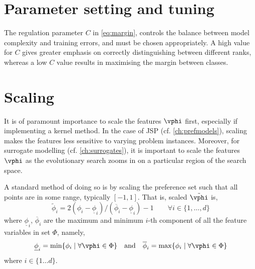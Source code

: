 \begin{comment}
\subsection{Kernel functions}
There are several choices for a kernel $\kappa$, e.g., \emph{polynomial kernel},
\begin{eqnarray}
\kappa_{\text{poly}}(\vec{x}_i,\vec{x}_j)&=& \left(1+\inner{\vec{x}_i}{\vec{x}_j} \right)^p
\end{eqnarray}
of order $p$, or the most commonly used kernel in the literature which implements a Gauss\-ian radial basis function, the \emph{rbf kernel},
\begin{eqnarray}
\kappa_{\text{rbf}}(\vec{x}_i,\vec{x}_j)&=& e^{-\gamma \norm{\vec{x}_i-\vec{x}_j}^2}
\end{eqnarray}
for $\gamma>0$.
\end{comment}

\section{Parameter setting and tuning}
The regulation parameter $C$ in \cref{eq:margin}, controls the balance between model complexity and training errors, and must be chosen appropriately. A high value for $C$ gives greater emphasis on correctly distinguishing between different ranks, whereas a low $C$ value results in maximising the margin between classes.

\section{Scaling}
It is of paramount importance to scale the features $\vphi$ first, especially if implementing a kernel method. 
In the case of JSP (cf. \cref{ch:prefmodels}), scaling makes the features less sensitive to varying problem instances.
Moreover, for surrogate modelling (cf. \cref{ch:surrogates}), it is important to scale the features $\vphi$ as the evolutionary search zooms in on a particular region of the search space. 

A standard method of doing so is by scaling the preference set such that all points are in some range, typically $[-1,1]$. That is, scaled $\tilde{\vphi}$ is,
\begin{equation}\label{eq:scale}
\tilde{\phi}_i = 2 (\phi_i - \underline{\phi}_i) / (\overline{\phi}_i - \underline{\phi}_i) - 1 
\quad\quad \forall i\in\{1,\ldots,d\}
\end{equation}
where $\underline{\phi}_i$, $\overline{\phi}_i$ are the maximum and minimum $i$-th component of all the feature variables in set $\Phi$, namely,
\begin{equation}
\underline{\phi}_i=\min\{\phi_i\;|\;\forall\vphi\in \Phi\} \quad\textrm{and}\quad \overline{\phi}_i=\max\{\phi_i\;|\;\forall\vphi\in \Phi\}
\end{equation}
where $i\in\{1\ldots d\}$. 


